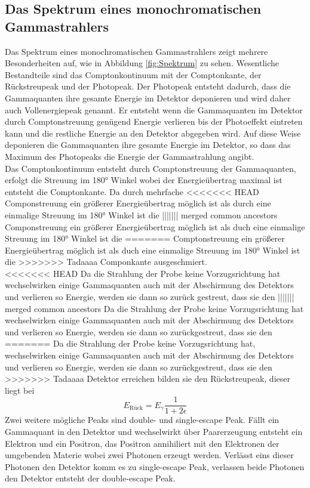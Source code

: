 \subsection{Das Spektrum eines monochromatischen Gammastrahlers}
Das Spektrum eines monochromatischen Gammastrahlers zeigt mehrere Besonderheiten auf, wie in Abbildung \ref{fig:Spektrum} zu
sehen. Wesentliche Bestandteile sind das Comptonkontinuum mit der Comptonkante, der Rückstreupeak
und der Photopeak. Der Photopeak entsteht dadurch, dass die Gammaquanten ihre gesamte Energie im Detektor deponieren
und wird daher auch Vollenergiepeak genannt. Er entsteht wenn die Gammaquanten im Detektor durch
Comptonstreuung genügend Energie verlieren bis der Photoeffekt eintreten kann und die restliche Energie
an den Detektor abgegeben wird. Auf diese Weise deponieren die Gammaquanten ihre gesamte Energie im
Detektor, so dass das Maximum des Photopeaks die Energie der Gammastrahlung angibt.\\
Das Comptonkontinuum entsteht durch Comptonstreuung der Gammaquanten, erfolgt die Streuung im
180° Winkel wobei der Energieübertrag maximal ist entsteht die Comptonkante. Da durch mehrfache
<<<<<<< HEAD
Componstreuung ein größerer Energieübertrag möglich ist als durch eine einmalige Streuung im 180° Winkel ist die
||||||| merged common ancestors
Componstreuung ein größerer Energieübertrag möglich ist als duch eine einmalige Streuung im 180° Winkel ist die
=======
Comptonstreuung ein größerer Energieübertrag möglich ist als duch eine einmalige Streuung im 180° Winkel ist die
>>>>>>> Tadaaaa
Componkante ausgeschmiert.\\
<<<<<<< HEAD
Da die Strahlung der Probe keine Vorzugsrichtung hat wechselwirken einige Gammaquanten auch mit der
Abschirmung des Detektors und verlieren so Energie, werden sie dann so zurück gestreut, dass sie den
||||||| merged common ancestors
Da die Strahlung der Probe keine Vorzugsrichtung hat wechselwirken einige Gammaquanten auch mit der
Abschirmung des Detektors und verlieren so Energie, werden sie dann so zurückgestreut, dass sie den
=======
Da die Strahlung der Probe keine Vorzugsrichtung hat, wechselwirken einige Gammaquanten auch mit der
Abschirmung des Detektors und verlieren so Energie, werden sie dann so zurückgestreut, dass sie den
>>>>>>> Tadaaaa
Detektor erreichen bilden sie den Rückstreupeak, dieser liegt bei
\begin{equation}
  E_{\text{Rück}}=E_{\gamma}\frac{1}{1+2\epsilon}
  \label{eqn:Rückstreu}
\end{equation}
Zwei weitere mögliche Peaks sind double- und single-escape Peak. Fällt ein Gammaquant in den Detektor und wechselwirkt über
Paarerzeugung entsteht ein Elektron und ein Positron, das Positron annihiliert mit den Elektronen der umgebenden Materie wobei
zwei Photonen erzeugt werden. Verlässt eins dieser Photonen den Detektor komm es zu single-escape Peak, verlassen beide
Photonen den Detektor entsteht der double-escape Peak.
\cite{Gilmore2}


